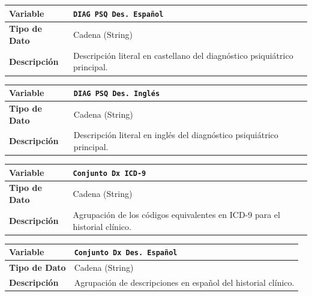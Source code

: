 \documentclass[12pt,a4paper,onecolumn,oneside]{report}
\begin{document}
\noindent
\begin{tabular}{|p{3.5cm}|p{10.5cm}|}
\hline
\rowcolor[RGB]{239,239,239} 
\textbf{Variable} & \textbf{\texttt{DIAG PSQ Des. Español}} \\ \hline
\textbf{Tipo de Dato} & Cadena (String) \\ \hline
\textbf{Descripción} & Descripción literal en castellano del diagnóstico psiquiátrico principal. \\ \hline
\end{tabular}
\label{tab:var_des_esp}
\vspace{0.4cm}

\noindent
\begin{tabular}{|p{3.5cm}|p{10.5cm}|}
\hline
\rowcolor[RGB]{239,239,239} 
\textbf{Variable} & \textbf{\texttt{DIAG PSQ Des. Inglés}} \\ \hline
\textbf{Tipo de Dato} & Cadena (String) \\ \hline
\textbf{Descripción} & Descripción literal en inglés del diagnóstico psiquiátrico principal. \\ \hline
\end{tabular}
\label{tab:var_des_ing}
\vspace{0.4cm}

\noindent
\begin{minipage}{\textwidth}
\begin{tabular}{|p{3.5cm}|p{10.5cm}|}
\hline
\rowcolor[RGB]{239,239,239} 
\textbf{Variable} & \textbf{\texttt{Conjunto Dx ICD-9}} \\ \hline
\textbf{Tipo de Dato} & Cadena (String) \\ \hline
\textbf{Descripción} & Agrupación de los códigos equivalentes en ICD-9 para el historial clínico. \\ \hline
\end{tabular}
\label{tab:var_conjunto_dx_icd9}
\end{minipage}
\vspace{0.4cm}

\noindent
\begin{tabular}{|p{3.5cm}|p{10.5cm}|}
\hline
\rowcolor[RGB]{239,239,239} 
\textbf{Variable} & \textbf{\texttt{Conjunto Dx Des. Español}} \\ \hline
\textbf{Tipo de Dato} & Cadena (String) \\ \hline
\textbf{Descripción} & Agrupación de descripciones en español del historial clínico. \\ \hline
\end{tabular}
\label{tab:var_conjunto_dx_des_esp}
\vspace{0.4cm}
\end{document}

